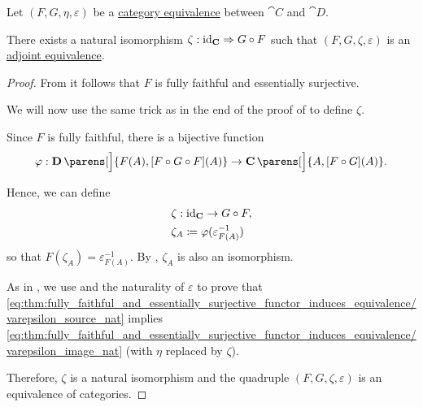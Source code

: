 \begin{proposition}\label{thm:adjoint_equivalence}
  Let \( (F, G, \eta, \varepsilon) \) be a \hyperref[def:category_equivalence]{category equivalence} between \( \cat{C} \) and \( \cat{D} \).

  There exists a natural isomorphism \( \zeta: \id_{\cat{C}} \Rightarrow G \bincirc F \) such that \( (F, G, \zeta, \varepsilon) \) is an \hyperref[def:adjoint_equivalence]{adjoint equivalence}.
\end{proposition}
\begin{proof}
  From  it follows that \( F \) is fully faithful and essentially surjective.

  We will now use the same trick as in the end of the proof of  to define \( \zeta \).

  Since \( F \) is fully faithful, there is a bijective function
  \begin{equation*}
    \varphi: \cat{D}\parens[\Big]{ F(A), [F \bincirc G \bincirc F](A) } \to \cat{C}\parens[\Big]{ A, [F \bincirc G](A) }.
  \end{equation*}

  Hence, we can define
  \begin{equation*}
    \begin{aligned}
      &\zeta: \id_{\cat{C}} \to G \bincirc F, \\
      &\zeta_A \coloneqq \varphi(\varepsilon_{F(A)}^{-1})
    \end{aligned}
  \end{equation*}
  so that \( F(\zeta_A) = \varepsilon_{F(A)}^{-1} \). By , \( \zeta_A \) is also an isomorphism.

  As in , we use  and the naturality of \( \varepsilon \) to prove that \eqref{eq:thm:fully_faithful_and_essentially_surjective_functor_induces_equivalence/varepsilon_source_nat} implies \eqref{eq:thm:fully_faithful_and_essentially_surjective_functor_induces_equivalence/varepsilon_image_nat} (with \( \eta \) replaced by \( \zeta \)).

  Therefore, \( \zeta \) is a natural isomorphism and the quadruple \( (F, G, \zeta, \varepsilon) \) is an equivalence of categories.
\end{proof}

